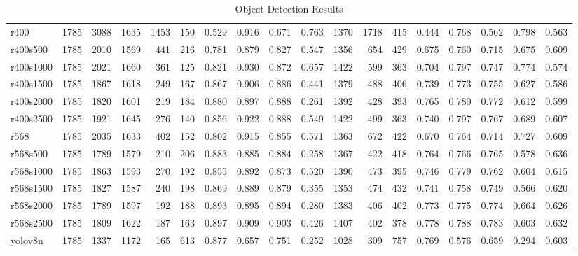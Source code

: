 \begin{table}
\begin{tabular}{|l|r|r|r|r|r|r|r|r|r|r|r|r|r|r|r|r|r|}
    \hline
    r400 & 1785 & 3088 & 1635 & 1453 & 150 & 0.529 & 0.916 & 0.671 & 0.763 & 1370 & 1718 & 415 & 0.444 & 0.768 & 0.562 & 0.798 & 0.563 \\
    r400s500 & 1785 & 2010 & 1569 & 441 & 216 & 0.781 & 0.879 & 0.827 & 0.547 & 1356 & 654 & 429 & 0.675 & 0.760 & 0.715 & 0.675 & 0.609 \\
    r400s1000 & 1785 & 2021 & 1660 & 361 & 125 & 0.821 & 0.930 & 0.872 & 0.657 & 1422 & 599 & 363 & 0.704 & 0.797 & 0.747 & 0.774 & 0.574 \\
    r400s1500 & 1785 & 1867 & 1618 & 249 & 167 & 0.867 & 0.906 & 0.886 & 0.441 & 1379 & 488 & 406 & 0.739 & 0.773 & 0.755 & 0.627 & 0.586 \\
    r400s2000 & 1785 & 1820 & 1601 & 219 & 184 & 0.880 & 0.897 & 0.888 & 0.261 & 1392 & 428 & 393 & 0.765 & 0.780 & 0.772 & 0.612 & 0.599 \\
    r400s2500 & 1785 & 1921 & 1645 & 276 & 140 & 0.856 & 0.922 & 0.888 & 0.549 & 1422 & 499 & 363 & 0.740 & 0.797 & 0.767 & 0.689 & 0.607 \\
    \hline
    r568 & 1785 & 2035 & 1633 & 402 & 152 & 0.802 & 0.915 & 0.855 & 0.571 & 1363 & 672 & 422 & 0.670 & 0.764 & 0.714 & 0.727 & 0.609 \\
    r568s500 & 1785 & 1789 & 1579 & 210 & 206 & 0.883 & 0.885 & 0.884 & 0.258 & 1367 & 422 & 418 & 0.764 & 0.766 & 0.765 & 0.578 & 0.636 \\
    r568s1000 & 1785 & 1863 & 1593 & 270 & 192 & 0.855 & 0.892 & 0.873 & 0.520 & 1390 & 473 & 395 & 0.746 & 0.779 & 0.762 & 0.604 & 0.615 \\
    r568s1500 & 1785 & 1827 & 1587 & 240 & 198 & 0.869 & 0.889 & 0.879 & 0.355 & 1353 & 474 & 432 & 0.741 & 0.758 & 0.749 & 0.566 & 0.620 \\
    r568s2000 & 1785 & 1789 & 1597 & 192 & 188 & 0.893 & 0.895 & 0.894 & 0.280 & 1383 & 406 & 402 & 0.773 & 0.775 & 0.774 & 0.664 & 0.626 \\
    r568s2500 & 1785 & 1809 & 1622 & 187 & 163 & 0.897 & 0.909 & 0.903 & 0.426 & 1407 & 402 & 378 & 0.778 & 0.788 & 0.783 & 0.603 & 0.632 \\
    \hline
    \hline
    yolov8n & 1785 & 1337 & 1172 & 165 & 613 & 0.877 & 0.657 & 0.751 & 0.252 & 1028 & 309 & 757 & 0.769 & 0.576 & 0.659 & 0.294 & 0.603 \\
    \hline
    \end{tabular}
    \caption{Object Detection Results}
    \label{tab:results}
    \end{table}

